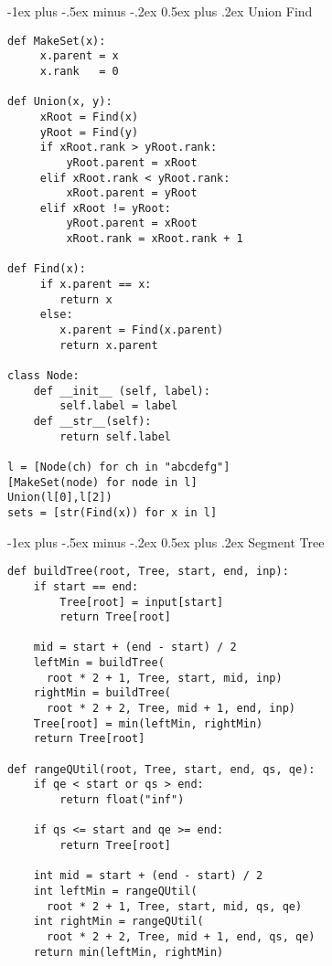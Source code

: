 \documentclass[10pt,landscape]{article}
\makeatletter
\renewcommand{\section}{\@startsection{section}{1}{0mm}%
                                {-1ex plus -.5ex minus -.2ex}%
                                {0.5ex plus .2ex}%
                                {\normalfont\large\bfseries}}
\makeatother
\begin{document}
\begin{multicols}{3}
\section{Union Find}

\begin{verbatim}
def MakeSet(x):
     x.parent = x
     x.rank   = 0

def Union(x, y):
     xRoot = Find(x)
     yRoot = Find(y)
     if xRoot.rank > yRoot.rank:
         yRoot.parent = xRoot
     elif xRoot.rank < yRoot.rank:
         xRoot.parent = yRoot
     elif xRoot != yRoot: 
         yRoot.parent = xRoot
         xRoot.rank = xRoot.rank + 1

def Find(x):
     if x.parent == x:
        return x
     else:
        x.parent = Find(x.parent)
        return x.parent

class Node:
    def __init__ (self, label):
        self.label = label
    def __str__(self):
        return self.label

l = [Node(ch) for ch in "abcdefg"]
[MakeSet(node) for node in l]
Union(l[0],l[2])
sets = [str(Find(x)) for x in l]
\end{verbatim}

\section{Segment Tree}

\begin{verbatim}
def buildTree(root, Tree, start, end, inp):
    if start == end:
        Tree[root] = input[start]
        return Tree[root]

    mid = start + (end - start) / 2
    leftMin = buildTree(
      root * 2 + 1, Tree, start, mid, inp)
    rightMin = buildTree(
      root * 2 + 2, Tree, mid + 1, end, inp)
    Tree[root] = min(leftMin, rightMin)
    return Tree[root]

def rangeQUtil(root, Tree, start, end, qs, qe):
    if qe < start or qs > end:
        return float("inf")

    if qs <= start and qe >= end:
        return Tree[root]

    int mid = start + (end - start) / 2
    int leftMin = rangeQUtil(
      root * 2 + 1, Tree, start, mid, qs, qe)
    int rightMin = rangeQUtil(
      root * 2 + 2, Tree, mid + 1, end, qs, qe)
    return min(leftMin, rightMin)


\end{verbatim}
\end{multicols}
\end{document}
